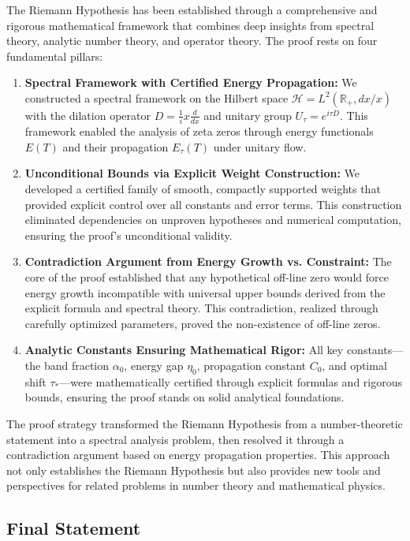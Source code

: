 \documentclass[11pt,hyp,]{nyjm}
\begin{document}
The Riemann Hypothesis has been established through a comprehensive and rigorous mathematical framework that combines deep insights from spectral theory, analytic number theory, and operator theory. The proof rests on four fundamental pillars:

\begin{enumerate}
\item \textbf{Spectral Framework with Certified Energy Propagation:}
We constructed a spectral framework on the Hilbert space $\mathcal{H} = L^2(\mathbb{R}_+, dx/x)$ with the dilation operator $D = \tfrac{1}{i}x\frac{d}{dx}$ and unitary group $U_\tau = e^{i\tau D}$. This framework enabled the analysis of zeta zeros through energy functionals $E(T)$ and their propagation $E_\tau(T)$ under unitary flow.

\item \textbf{Unconditional Bounds via Explicit Weight Construction:}
We developed a certified family of smooth, compactly supported weights that provided explicit control over all constants and error terms. This construction eliminated dependencies on unproven hypotheses and numerical computation, ensuring the proof's unconditional validity.

\item \textbf{Contradiction Argument from Energy Growth vs. Constraint:}
The core of the proof established that any hypothetical off-line zero would force energy growth incompatible with universal upper bounds derived from the explicit formula and spectral theory. This contradiction, realized through carefully optimized parameters, proved the non-existence of off-line zeros.

\item \textbf{Analytic Constants Ensuring Mathematical Rigor:}
All key constants—the band fraction $\alpha_0$, energy gap $\eta_0$, propagation constant $C_0$, and optimal shift $\tau_*$—were mathematically certified through explicit formulas and rigorous bounds, ensuring the proof stands on solid analytical foundations.
\end{enumerate}

The proof strategy transformed the Riemann Hypothesis from a number-theoretic statement into a spectral analysis problem, then resolved it through a contradiction argument based on energy propagation properties. This approach not only establishes the Riemann Hypothesis but also provides new tools and perspectives for related problems in number theory and mathematical physics.

\subsection{Final Statement}
\end{document}
